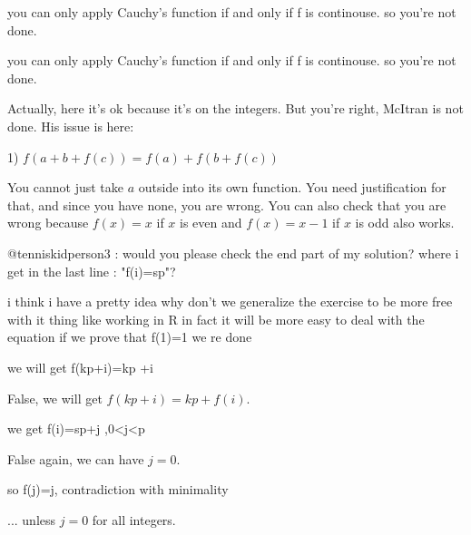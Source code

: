 \begin{solution}
	you can only apply Cauchy's function if and only if f is continouse.
so you're not done.
\end{solution}



\begin{solution}
	\begin{tcolorbox}you can only apply Cauchy's function if and only if f is continouse.
so you're not done.\end{tcolorbox}

Actually, here it's ok because it's on the integers.  But you're right, McItran is not done.  His issue is here:

\begin{tcolorbox}1) $f(a+b+f(c))=f(a)+f(b+f(c))$\end{tcolorbox}

You cannot just take $a$ outside into its own function.  You need justification for that, and since you have none, you are wrong.  You can also check that you are wrong because $f(x)=x$ if $x$ is even and $f(x)=x-1$ if $x$ is odd also works.
\end{solution}



\begin{solution}
	@tenniskidperson3 : would you please check the end part of my solution? where i get in the last line : "f(i)=sp"?
\end{solution}



\begin{solution}
	i think i have a pretty idea why don't we generalize the exercise to be more free with it thing like working in R 
in fact it will be more easy to deal with the equation
if we prove that f(1)=1 we re done
\end{solution}



\begin{solution}
	\begin{tcolorbox}we will get f(kp+i)=kp +i\end{tcolorbox}

False, we will get $f(kp+i)=kp+f(i)$.

\begin{tcolorbox}we get f(i)=sp+j ,0<j<p\end{tcolorbox}

False again, we can have $j=0$.

\begin{tcolorbox}so f(j)=j, contradiction with minimality\end{tcolorbox}

... unless $j=0$ for all integers.
\end{solution}



